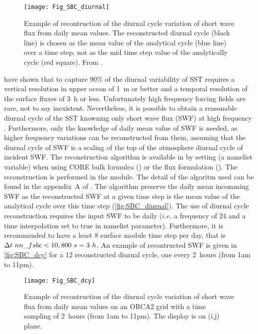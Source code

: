 \documentclass[../tex_main/NEMO_manual]{subfiles}
\begin{document}
\begin{figure}[!t]    \begin{center}
\texttt{[image: Fig\_SBC\_diurnal]}
\caption{ \protect\label{fig:SBC_diurnal}    
Example of recontruction of the diurnal cycle variation of short wave flux  
from daily mean values. The reconstructed diurnal cycle (black line) is chosen 
as the mean value of the analytical cycle (blue line) over a time step, not 
as the mid time step value of the analytically cycle (red square). From \citet{Bernie_al_CD07}.}
\end{center}   \end{figure}

\cite{Bernie_al_JC05} have shown that to capture 90$\%$ of the diurnal variability of 
SST requires a vertical resolution in upper ocean of 1~m or better and a temporal resolution 
of the surface fluxes of 3~h or less. Unfortunately high frequency forcing fields are rare, 
not to say inexistent. Nevertheless, it is possible to obtain a reasonable diurnal cycle 
of the SST knowning only short wave flux (SWF) at high frequency \citep{Bernie_al_CD07}.
Furthermore, only the knowledge of daily mean value of SWF is needed, 
as higher frequency variations can be reconstructed from them, assuming that 
the diurnal cycle of SWF is a scaling of the top of the atmosphere diurnal cycle 
of incident SWF. The \cite{Bernie_al_CD07} reconstruction algorithm is available
in \NEMO by setting  (a \textit{} namelist variable) when using 
CORE bulk formulea () or the flux formulation (). 
The reconstruction is performed in the  module. The detail of the algoritm used 
can be found in the appendix~A of \cite{Bernie_al_CD07}. The algorithm preserve the daily 
mean incomming SWF as the reconstructed SWF at a given time step is the mean value 
of the analytical cycle over this time step (\autoref{fig:SBC_diurnal}). 
The use of diurnal cycle reconstruction requires the input SWF to be daily 
($i.e.$ a frequency of 24 and a time interpolation set to true in  namelist parameter).
Furthermore, it is recommended to have a least 8 surface module time step per day,
that is  $\rdt \ nn\_fsbc < 10,800~s = 3~h$. An example of recontructed SWF 
is given in \autoref{fig:SBC_dcy} for a 12 reconstructed diurnal cycle, one every 2~hours 
(from 1am to 11pm).

\begin{figure}[!t]  \begin{center}
\texttt{[image: Fig\_SBC\_dcy]}
\caption{ \protect\label{fig:SBC_dcy}   
Example of recontruction of the diurnal cycle variation of short wave flux  
from daily mean values on an ORCA2 grid with a time sampling of 2~hours (from 1am to 11pm). 
The display is on (i,j) plane. }
\end{center}   \end{figure}
\end{document}
